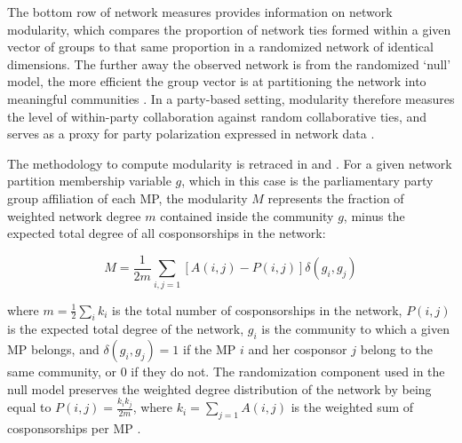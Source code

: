 
The bottom row of network measures provides information on network modularity, which compares the proportion of network ties formed within a given vector of groups to that same proportion in a randomized network of identical dimensions. The further away the observed network is from the randomized `null' model, the more efficient the group vector is at partitioning the network into meaningful communities \citep{Newman2006-PR}. In a party-based setting, modularity therefore measures the level of within-party collaboration against random collaborative ties, and serves as a proxy for party polarization expressed in network data \citep{ZhangFriend2008-P,WaughPei2009-A,Kirkland2013-SPPQ}.%

The methodology to compute modularity is retraced in \citet{WaughPei2009-A} and \citet{KirklandGross2012-SN}. For a given network partition membership variable $g$, which in this case is the parliamentary party group affiliation of each MP, the modularity $M$ represents the fraction of weighted network degree $m$ contained inside the community $g$, minus the expected total degree of all cosponsorships in the network:

     \[ M = \frac{1}{2m}\displaystyle\sum_{i,j=1}[ A(i,j) - P(i,j) ]\delta(g_i,g_j) \]

     where $m = \frac{1}{2} \sum_i k_i$ is the total number of cosponsorships in the network, $P(i,j)$ is the expected total degree of the network, $g_i$ is the community to which a given MP belongs, and $\delta(g_i, g_j) = 1$ if the MP $i$ and her cosponsor $j$ belong to the same community, or $0$ if they do not. The randomization component used in the null model preserves the weighted degree distribution of the network by being equal to $P(i,j) = \frac{k_i k_j}{2m}$, where $k_i = \displaystyle\sum_{j=1} A(i,j)$ is the weighted sum of cosponsorships per MP \citep{Newman2006-PR}.%

